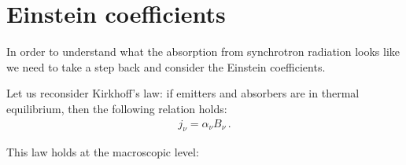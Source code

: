 \documentclass[main.tex]{subfiles}
\begin{document}
\section{Einstein coefficients}

In order to understand what the absorption from synchrotron radiation looks like we need to take a step back and consider the Einstein coefficients. 

Let us reconsider Kirkhoff's law: if emitters and absorbers are in thermal equilibrium, then the following relation holds: 
%
\begin{align}
j_\nu = \alpha _\nu B_\nu 
\,.
\end{align}

This law holds at the macroscopic level: 
\end{document}
